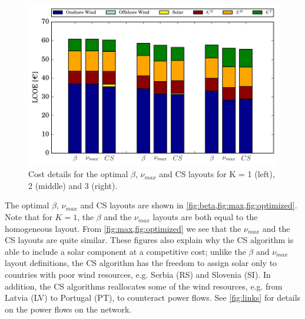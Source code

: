 \documentclass[a4paper, 12pt, sort&compress]{elsarticle}%
\begin{document}
\begin{figure}[h!]
  \centering
  \includegraphics[width = \columnwidth]{costVE50}
  \caption{Cost details for the optimal $\beta$, $\nu_{max}$ and CS layouts
    for K = 1 (left), 2 (middle) and 3 (right).}
  \label{fig:cost}
\end{figure}

The optimal $\beta$, $\nu_{max}$ and CS layouts are shown in
\cref{fig:beta,fig:max,fig:optimized}. Note that for $K=1$, the
$\beta$ and the $\nu_{max}$ layouts are both equal to the homogeneous
layout.  From \cref{fig:max,fig:optimized} we see that the $\nu_{max}$
and the CS layouts are quite similar. These figures also explain why
the CS algorithm is able to include a solar component at a competitive
cost; unlike the $\beta$ and $\nu_{max}$ layout definitions, the CS algorithm
has the freedom to assign solar only to countries with poor wind
resources, e.g. Serbia (RS) and Slovenia (SI). In addition, the CS
algorithms reallocates some of the wind resources, e.g. from Latvia
(LV) to Portugal (PT), to counteract power flows. See \cref{fig:links}
for details on the power flows on the network.


\end{document}
